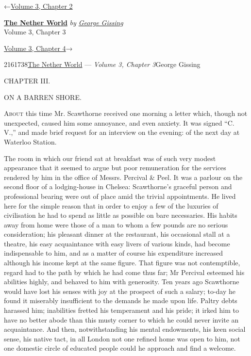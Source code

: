 \hypertarget{headerContainer}{}
\hypertarget{navigationHeader}{}
\protect\hypertarget{headerprevious}{}{←\href{/wiki/The_Nether_World/Volume_3/Chapter_2}{Volume
3, Chapter 2}}

\textbf{\protect\hypertarget{header_title_text}{}{\href{/wiki/The_Nether_World}{The
Nether World}}} \emph{by
\href{/wiki/Author:George_Gissing}{\protect\hypertarget{header_author_text}{}{{George
Gissing}}}}\\
\protect\hypertarget{header_section_text}{}{Volume 3, Chapter 3}

\protect\hypertarget{headernext}{}{\href{/wiki/The_Nether_World/Volume_3/Chapter_4}{Volume
3, Chapter 4}→}

\hypertarget{navigationNotes}{}

\hypertarget{ws-data}{}
\protect\hypertarget{ws-article-id}{}{2161738}\protect\hypertarget{ws-title}{}{\href{/wiki/The_Nether_World}{The
Nether World} --- \emph{Volume 3, Chapter
3}}\protect\hypertarget{ws-author}{}{George Gissing}

{\protect\hypertarget{47}{}{}}

{CHAPTER III.}

ON A BARREN SHORE.

\textsc{About} this time Mr. Scawthorne received one morning a letter
which, though not unexpected, caused him some annoyance, and even
anxiety. It was signed ``C. V.,'' and made brief request for an
interview on the evening: of the next day at Waterloo Station.

The room in which our friend sat at breakfast was of such very modest
appearance that it seemed to argue but poor remuneration for the
services rendered by him in the office of Messrs. Percival \& Peel. It
was a parlour on the second floor of a lodging-house in Chelsea:
Scawthorne's graceful person and professional bearing were out of place
amid the trivial appointments. He lived here for the simple reason that
in order to enjoy a few of the luxuries of civilisation he had to spend
as little as possible on bare necessaries. His habits
{\protect\hypertarget{48}{}{}}away from home were those of a man to whom
a few pounds are no serious consideration; his pleasant dinner at the
restaurant, his occasional stall at a theatre, his easy acquaintance
with easy livers of various kinds, had become indispensable to him, and
as a matter of course his expenditure increased although his income kept
at the same figure. That figure was not contemptible, regard had to the
path by which he had come thus far; Mr Percival esteemed his abilities
highly, and behaved to him with generosity. Ten years ago Scawthorne
would have lost his senses with joy at the prospect of such a salary;
to-day he found it miserably insufficient to the demands he made upon
life. Paltry debts harassed him; inabilities fretted his temperament and
his pride; it irked him to have no better abode than this musty corner
to which he could never invite an acquaintance. And then,
notwithstanding his mental endowments, his keen social sense, his native
tact, in all London not one refined home was open to him, not one
domestic circle of educated people could he approach and find a welcome.

